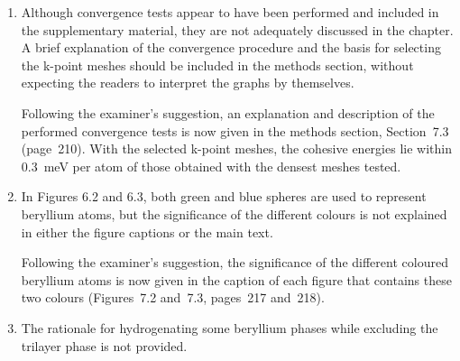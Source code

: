 \documentclass[12pt,a4paper]{article}
\newenvironment{reply}{\par\medskip\color{replyblue}}{\par\medskip}
\begin{document}
\begin{enumerate}[leftmargin=*]
\begin{enumerate}[label=\arabic*.,leftmargin=*]
\begin{reply}
The reason we did not employ HSE06 for the optical calculations is that all structures in the optical comparison, except 2H-$\alpha$-beryllene, are metallic.
HSE06 brings a significant improvement in the accuracy of the electronic band gap and associated properties of semiconducting or insulating materials.
Therefore, we expect the results obtained from GGA-PBE to be sufficiently accurate for the comparison between the metallic structures.
HSE06 is now used to test the band gaps and band order (Section~7.3, page~213).
HSE06 reproduces the parity products used for the $\mathbb{Z}_2$ indices (page~228).
For 2H-$\alpha$-beryllene, HSE06 increases the indirect gap from 4.84 to 6.00~eV (page~224).
Section~8.3 (page~282) discusses the resulting uncertainty in its absorption onset, and Section~8.4.3 (page~286) proposes quasiparticle and Bethe--Salpeter calculations to locate it.
\end{reply}

\item Although convergence tests appear to have been performed and included in the supplementary material, they are not adequately discussed in the chapter. A brief explanation of the convergence procedure and the basis for selecting the k-point meshes should be included in the methods section, without expecting the readers to interpret the graphs by themselves.

\begin{reply}
Following the examiner's suggestion, an explanation and description of the performed convergence tests is now given in the methods section, Section~7.3 (page~210).
With the selected k-point meshes, the cohesive energies lie within 0.3~meV per atom of those obtained with the densest meshes tested.
\end{reply}

\item In Figures 6.2 and 6.3, both green and blue spheres are used to represent beryllium atoms, but the significance of the different colours is not explained in either the figure captions or the main text.

\begin{reply}
Following the examiner's suggestion, the significance of the different coloured beryllium atoms is now given in the caption of each figure that contains these two colours (Figures~7.2 and~7.3, pages~217 and~218).
\end{reply}

\item The rationale for hydrogenating some beryllium phases while excluding the trilayer phase is not provided.


\end{enumerate}
\end{enumerate}
\end{document}
